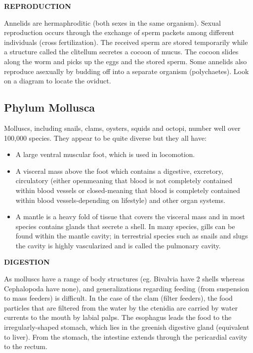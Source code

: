 \documentclass[
]{book}
\providecommand{\tightlist}{%
  \setlength{\itemsep}{0pt}\setlength{\parskip}{0pt}}
\begin{document}
\textbf{REPRODUCTION}

Annelids are hermaphroditic (both sexes in the same organism). Sexual reproduction occurs through the exchange of sperm packets among different individuals (cross fertilization). The received sperm are stored temporarily while a structure called the clitellum secretes a cocoon of mucus. The cocoon slides along the worm and picks up the eggs and the stored sperm. Some annelids also reproduce asexually by budding off into a separate organism (polychaetes). Look on a diagram to locate the oviduct.

\hypertarget{phylum-mollusca}{%
\subsection*{Phylum Mollusca}\label{phylum-mollusca}}

Molluscs, including snails, clams, oysters, squids and octopi, number well over 100,000 species. They appear to be quite diverse but they all have:

\begin{itemize}
\tightlist
\item
  A large ventral muscular foot, which is used in locomotion.
\item
  A visceral mass above the foot which contains a digestive, excretory, circulatory (either openmeaning that blood is not completely contained within blood vessels or closed-meaning that
  blood is completely contained within blood vessels-depending on lifestyle) and other organ
  systems.
\item
  A mantle is a heavy fold of tissue that covers the visceral mass and in most species contains
  glands that secrete a shell. In many species, gills can be found within the mantle cavity; in
  terrestrial species such as snails and slugs the cavity is highly vascularized and is called the
  pulmonary cavity.
\end{itemize}

\textbf{DIGESTION}

As molluscs have a range of body structures (eg. Bivalvia have 2 shells whereas Cephalopoda have
none), and generalizations regarding feeding (from suspension to mass feeders) is difficult. In the
case of the clam (filter feeders), the food particles that are filtered from the water by the ctenidia
are carried by water currents to the mouth by labial palps. The esophagus leads the food to the irregularly-shaped stomach, which lies in the greenish digestive gland (equivalent to liver). From the stomach, the intestine extends through the pericardial cavity to the rectum.
\end{document}
